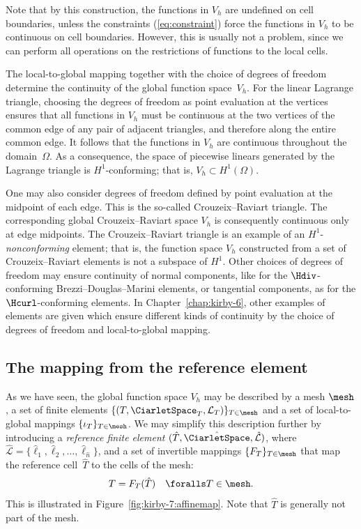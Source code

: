Note that by this construction, the functions in $V_h$ are undefined
on cell boundaries, unless the constraints (\ref{eq:constraint}) force
the functions in $V_h$ to be continuous on cell boundaries. However,
this is usually not a problem, since we can perform all operations on
the restrictions of functions to the local cells.

The local-to-global mapping together with the choice of degrees of
freedom determine the continuity of the global function space~$V_h$.
For the linear Lagrange triangle, choosing the degrees of freedom as
point evaluation at the vertices ensures that all functions in $V_h$
must be continuous at the two vertices of the common edge of any pair
of adjacent triangles, and therefore along the entire common edge. It
follows that the functions in $V_h$ are continuous throughout the
domain~$\Omega$. As a consequence, the space of piecewise linears
generated by the Lagrange triangle is $H^1$-conforming; that is, $V_h
\subset H^1(\Omega)$.

%
One may also consider degrees of freedom defined by point evaluation
at the midpoint of each edge. This is the so-called Crouzeix--Raviart
triangle. The corresponding global Crouzeix--Raviart space $V_h$ is
consequently continuous only at edge midpoints. The Crouzeix--Raviart
triangle is an example of an $H^1$-\emph{nonconforming} element; that
is, the function space $V_h$ constructed from a set of
Crouzeix--Raviart elements is not a subspace of $H^1$. Other choices
of degrees of freedom may ensure continuity of normal components, like
for the $\Hdiv$-conforming Brezzi--Douglas--Marini elements, or
tangential components, as for the $\Hcurl$-conforming \nedelec{}
elements. In Chapter~\ref{chap:kirby-6}, other examples of elements
are given which ensure different kinds of continuity by the choice of
degrees of freedom and local-to-global mapping.

\subsection{The mapping from the reference element}

As we have seen, the global function space $V_h$ may be described by a
mesh $\mesh$, a set of finite elements
$\{(T,\CiarletSpace_T,\mathcal{L}_T)\}_{T\in\mesh}$ and a set of
local-to-global mappings $\{\iota_T\}_{T\in\mesh}$. We may simplify
this description further by introducing a \emph{reference finite
  element} $(\hat{T},\hat{\CiarletSpace},\hat{\mathcal{L}})$,
where $\hat{\mathcal{L}} =
\{\hat{\ell}_1,\hat{\ell}_2,\ldots,\hat{\ell}_{\hat{n}}\}$, and
a set of invertible mappings $\{F_T\}_{T\in\mesh}$ that map the
reference cell~$\hat{T}$ to the cells of the mesh:
\begin{equation}
  T = F_T(\hat{T}) \quad \foralls T \in \mesh.
\end{equation}
This is illustrated in Figure~\ref{fig:kirby-7:affinemap}. Note that
$\hat{T}$ is generally not part of the mesh.

